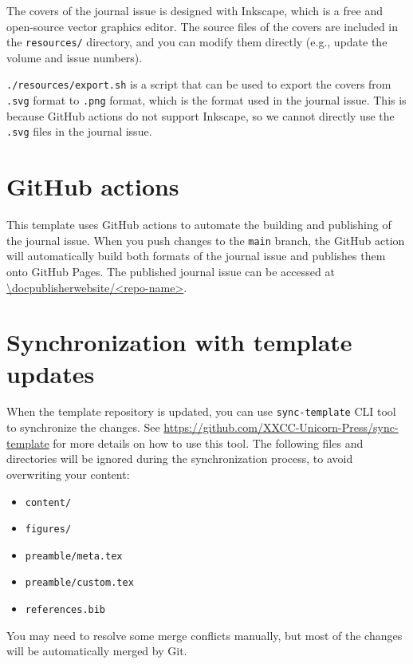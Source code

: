 The covers of the journal issue is designed with Inkscape, which is a free and open-source vector graphics editor.
The source files of the covers are included in the \verb|resources/| directory, and you can modify them directly (e.g., update the volume and issue numbers).

\verb|./resources/export.sh| is a script that can be used to export the covers from \verb|.svg| format to \verb|.png| format, which is the format used in the journal issue.
This is because GitHub actions do not support Inkscape, so we cannot directly use the \verb|.svg| files in the journal issue.

\section{GitHub actions}

This template uses GitHub actions to automate the building and publishing of the journal issue.
When you push changes to the \verb|main| branch, the GitHub action will automatically build both formats of the journal issue and publishes them onto GitHub Pages.
The published journal issue can be accessed at \url{\docpublisherwebsite/<repo-name>}.

\section{Synchronization with template updates}

When the template repository is updated, you can use \verb|sync-template| CLI tool to synchronize the changes.
See \url{https://github.com/XXCC-Unicorn-Press/sync-template} for more details on how to use this tool.
The following files and directories will be ignored during the synchronization process, to avoid overwriting your content:
\begin{itemize}
  \item \verb|content/|
  \item \verb|figures/|
  \item \verb|preamble/meta.tex|
  \item \verb|preamble/custom.tex|
  \item \verb|references.bib|
\end{itemize}
You may need to resolve some merge conflicts manually, but most of the changes will be automatically merged by Git.
